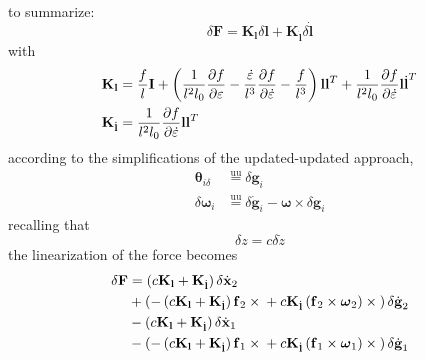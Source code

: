 \documentclass[10pt,dvips,fleqn,subeqn]{report}
\newcommand{\T}[1]{\bm{\mathbf{#1}}}
\newcommand{\equu}{\overset{\text{uu}}{=}}
\begin{document}
to summarize:
\begin{equation}
	\delta\T{F} = \T{K}_{\T{l}} \delta\T{l} + \T{K}_{\dot{\T{l}}} \delta\dot{\T{l}}
\end{equation}
with
\begin{subequations}
\begin{align}
	\T{K}_{\T{l}} &= \frac{f}{l} \T{I}
		+ \plbr{
			\frac{1}{l^2 l_0} \frac{\partial{f}}{\partial\varepsilon}
			- \frac{\dot{\varepsilon}}{l^3} \frac{\partial{f}}{\partial\dot{\varepsilon}}
			- \frac{f}{l^3}
		}\T{l}\T{l}^T
		+ \frac{1}{l^2 l_0} \frac{\partial{f}}{\partial\dot{\varepsilon}} \T{l}\dot{\T{l}}^T \\
	\T{K}_{\dot{\T{l}}} &= \frac{1}{l^2 l_0} \frac{\partial{f}}{\partial\dot{\varepsilon}} \T{l}\T{l}^T
\end{align}
\end{subequations}
according to the simplifications of the updated-updated approach,
\begin{subequations}
\begin{align}
	\T{\theta}_{i\delta} &\equu \delta\T{g}_i \\
	\delta\T{\omega}_i &\equu \delta\dot{\T{g}}_i - \T{\omega}\times\delta\T{g}_i
\end{align}
\end{subequations}
recalling that
\begin{equation}
	\delta{z} = c \delta\dot{z}
\end{equation}
the linearization of the force becomes
\begin{align}
	\delta\T{F} &= \plbr{c\T{K}_{\T{l}} + \T{K}_{\dot{\T{l}}}} \delta\dot{\T{x}}_2
		\nonumber \\
		& + \plbr{
			- \plbr{c\T{K}_{\T{l}} + \T{K}_{\dot{\T{l}}}} \T{f}_2\times{}
			+ c \T{K}_{\dot{\T{l}}} \plbr{\T{f}_2 \times \T{\omega}_2}\times{}
		} \delta\dot{\T{g}}_2
		\nonumber \\
		& - \plbr{c\T{K}_{\T{l}} + \T{K}_{\dot{\T{l}}}} \delta\dot{\T{x}}_1
		\nonumber \\
		& - \plbr{
			- \plbr{c\T{K}_{\T{l}} + \T{K}_{\dot{\T{l}}}} \T{f}_1\times{}
			+ c \T{K}_{\dot{\T{l}}} \plbr{\T{f}_1 \times \T{\omega}_1}\times{}
		} \delta\dot{\T{g}}_1
\end{align}
\end{document}
